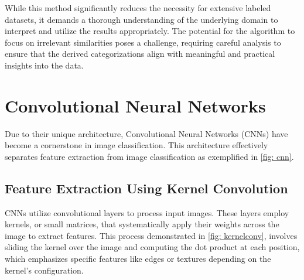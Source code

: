 While this method significantly reduces the necessity for extensive labeled datasets, it demands a thorough understanding of the underlying domain to interpret and utilize the results appropriately. The potential for the algorithm to focus on irrelevant similarities poses a challenge, requiring careful analysis to ensure that the derived categorizations align with meaningful and practical insights into the data.

\section{Convolutional Neural Networks}

Due to their unique architecture, Convolutional Neural Networks (CNNs) have become a cornerstone in image classification. This architecture effectively separates feature extraction from image classification\cite{LeCun1998-CNN} as exemplified in \autoref{fig: cnn}.

\subsection{Feature Extraction Using Kernel Convolution}
CNNs utilize convolutional layers to process input images. These layers employ kernels, or small matrices, that systematically apply their weights across the image to extract features\cite{LeCun1998-CNN}. This process demonstrated in \autoref{fig: kernelconv}, involves sliding the kernel over the image and computing the dot product at each position, which emphasizes specific features like edges or textures depending on the kernel's configuration.

